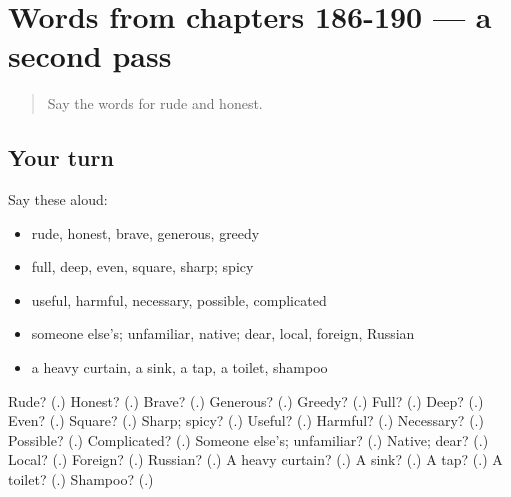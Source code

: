 \section[(dialogue)]{Words from chapters 186-190 — a second pass}

\label{lesson:RU-R190-second-pass-words-from-chapters-186-190}



\begin{quote}
Say the words for rude and honest.
\end{quote}

\subsection*{Your turn}
Say these aloud:

\begin{itemize}
\raggedright
  \item rude, honest, brave, generous, greedy
  \item full, deep, even, square, sharp; spicy
  \item useful, harmful, necessary, possible, complicated
  \item someone else's; unfamiliar, native; dear, local, foreign, Russian
  \item a heavy curtain, a sink, a tap, a toilet, shampoo
\end{itemize}

\begin{tcolorbox}[breakable,colback=teal!4,colframe=teal!35!black,title={Before you move on}]
Rude? (\textbf{}.) Honest? (\textbf{}.) Brave? (\textbf{}.) Generous? (\textbf{}.) Greedy? (\textbf{}.) Full? (\textbf{}.) Deep? (\textbf{}.) Even? (\textbf{}.) Square? (\textbf{}.) Sharp; spicy? (\textbf{}.) Useful? (\textbf{}.) Harmful? (\textbf{}.) Necessary? (\textbf{}.) Possible? (\textbf{}.) Complicated? (\textbf{}.) Someone else's; unfamiliar? (\textbf{}.) Native; dear? (\textbf{}.) Local? (\textbf{}.) Foreign? (\textbf{}.) Russian? (\textbf{}.) A heavy curtain? (\textbf{}.) A sink? (\textbf{}.) A tap? (\textbf{}.) A toilet? (\textbf{}.) Shampoo? (\textbf{}.)
\end{tcolorbox}
